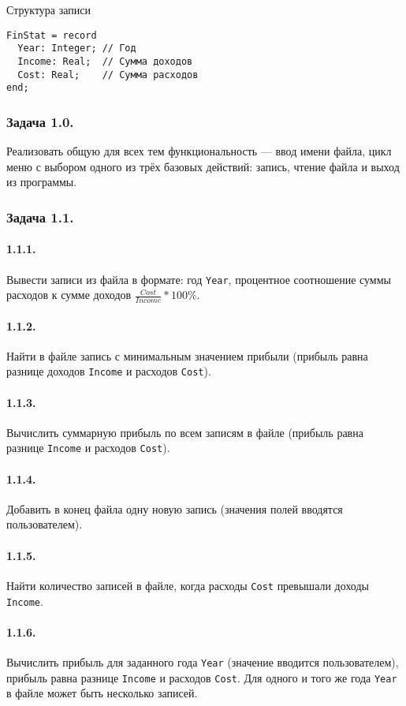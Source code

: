 \documentclass[12pt,a4paper]{report}
\begin{document}
Структура записи
\begin{verbatim}
FinStat = record
  Year: Integer; // Год
  Income: Real;  // Сумма доходов
  Cost: Real;    // Сумма расходов
end;
\end{verbatim}

\subsubsection{Задача 1.0.} Реализовать общую для всех тем функциональность --- ввод имени файла, цикл меню с выбором одного из трёх базовых действий: запись, чтение файла и выход из программы.

\subsubsection{Задача 1.1.}
\paragraph{1.1.1.} Вывести записи из файла в формате: год \texttt{Year}, процентное соотношение суммы расходов к сумме доходов $ \frac {Cost} {Income} * 100 \% $.
\paragraph{1.1.2.} Найти в файле запись с минимальным значением прибыли (прибыль равна разнице доходов \texttt{Income} и расходов \texttt{Cost}). 
\paragraph{1.1.3.} Вычислить суммарную прибыль по всем записям в файле (прибыль равна разнице \texttt{Income} и расходов \texttt{Cost}).
\paragraph{1.1.4.} Добавить в конец файла одну новую запись (значения полей вводятся пользователем).
\paragraph{1.1.5.} Найти количество записей в файле, когда расходы \texttt{Cost} превышали доходы \texttt{Income}.
\paragraph{1.1.6.} Вычислить прибыль для заданного года \texttt{Year} (значение вводится пользователем), прибыль равна разнице \texttt{Income} и расходов \texttt{Cost}. Для одного и того же года \texttt{Year} в файле может быть несколько записей.
\end{document}
